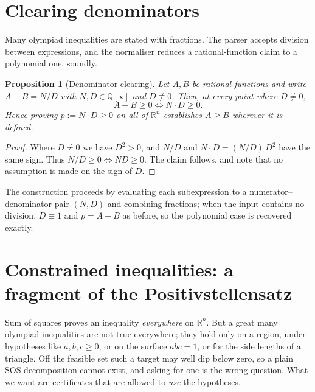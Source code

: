 \documentclass[11pt]{article}
\theoremstyle{definition}
\theoremstyle{plain}
\newtheorem{proposition}[definition]{Proposition}
\newcommand{\R}{\mathbb{R}}
\newcommand{\Q}{\mathbb{Q}}
\newcommand{\x}{\mathbf{x}}
\begin{document}
\section{Clearing denominators}
\label{sec:clearing}

Many olympiad inequalities are stated with fractions. The parser accepts
division between expressions, and the normaliser reduces a rational-function
claim to a polynomial one, soundly.

\begin{proposition}[Denominator clearing]\label{prop:clearing}
Let $A, B$ be rational functions and write $A - B = N/D$ with $N, D \in \Q[\x]$
and $D \not\equiv 0$. Then, at every point where $D \ne 0$,
\[
  A - B \ge 0 \iff N \cdot D \ge 0 .
\]
Hence proving $p := N\cdot D \ge 0$ on all of $\R^n$ establishes $A \ge B$
wherever it is defined.
\end{proposition}
\begin{proof}
Where $D \ne 0$ we have $D^2 > 0$, and $N/D$ and $N\cdot D = (N/D)\,D^2$ have the
same sign. Thus $N/D \ge 0 \iff N D \ge 0$. The claim follows, and note that no
assumption is made on the sign of $D$.
\end{proof}

The construction proceeds by evaluating each subexpression to a
numerator--denominator pair $(N, D)$ and combining fractions; when the input
contains no division, $D \equiv 1$ and $p = A - B$ as before, so the polynomial
case is recovered exactly.

\section{Constrained inequalities: a fragment of the Positivstellensatz}
\label{sec:constrained}

Sum of squares proves an inequality \emph{everywhere} on $\R^n$. But a great
many olympiad inequalities are not true everywhere; they hold only on a region,
under hypotheses like $a,b,c \ge 0$, or on the surface $abc = 1$, or for the side
lengths of a triangle. Off the feasible set such a target may well dip below
zero, so a plain SOS decomposition cannot exist, and asking for one is the wrong
question. What we want are certificates that are allowed to \emph{use} the
hypotheses.
\end{document}
